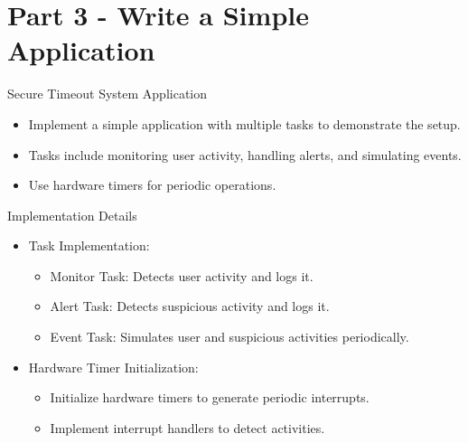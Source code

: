 \section{Part 3 - Write a Simple Application}

\begin{frame}{Secure Timeout System Application}
    \begin{itemize}
        \item Implement a simple application with multiple tasks to demonstrate the setup.
        \item Tasks include monitoring user activity, handling alerts, and simulating events.
        \item Use hardware timers for periodic operations.
    \end{itemize}
\end{frame}

\begin{frame}{Implementation Details}
    \begin{itemize}
        \item Task Implementation:
        \begin{itemize}
            \item Monitor Task: Detects user activity and logs it.
            \item Alert Task: Detects suspicious activity and logs it.
            \item Event Task: Simulates user and suspicious activities periodically.
        \end{itemize}
        \item Hardware Timer Initialization:
        \begin{itemize}
            \item Initialize hardware timers to generate periodic interrupts.
            \item Implement interrupt handlers to detect activities.
        \end{itemize}
    \end{itemize}
\end{frame}
